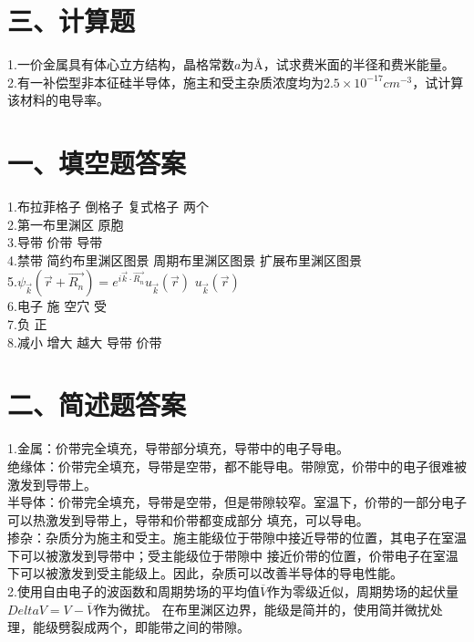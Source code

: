 \documentclass[UTF8]{ctexart}
\begin{document}
\section*{三、计算题}
1.一价金属具有体心立方结构，晶格常数$a$为\AA，试求费米面的半径和费米能量。\\
2.有一补偿型非本征硅半导体，施主和受主杂质浓度均为$2.5\times10^{-17}cm^{-3}$，试计算该材料的电导率。\\

\newpage
\section*{一、填空题答案}
1.布拉菲格子\makebox[2em]{}
倒格子\makebox[2em]{}
复式格子\makebox[2em]{}
两个\\
2.第一布里渊区\makebox[2em]{}
原胞\\
3.导带\makebox[2em]{}
价带\makebox[2em]{}
导带\\
4.禁带\makebox[2em]{}
简约布里渊区图景\makebox[2em]{}
周期布里渊区图景\makebox[2em]{}
扩展布里渊区图景\\
5.$\psi_{\vec{k}}(\vec{r}+\vec{R_n})=e^{i\vec{k}\cdot\vec{R_n}}u_{\vec{k}}(\vec{r})$\makebox[2em]{}
$u_{\vec{k}}(\vec{r})$\\
6.电子\makebox[2em]{}
施\makebox[2em]{}
空穴\makebox[2em]{}
受\\
7.负\makebox[2em]{}
正\\
8.减小\makebox[2em]{}
增大\makebox[2em]{}
越大\makebox[2em]{}
导带\makebox[2em]{}
价带\\
\section*{二、简述题答案}
1.金属：价带完全填充，导带部分填充，导带中的电子导电。\\
绝缘体：价带完全填充，导带是空带，都不能导电。带隙宽，价带中的电子很难被激发到导带上。\\
半导体：价带完全填充，导带是空带，但是带隙较窄。室温下，价带的一部分电子可以热激发到导带上，导带和价带都变成部分
填充，可以导电。\\
掺杂：杂质分为施主和受主。施主能级位于带隙中接近导带的位置，其电子在室温下可以被激发到导带中；受主能级位于带隙中
接近价带的位置，价带电子在室温下可以被激发到受主能级上。因此，杂质可以改善半导体的导电性能。\\
2.使用自由电子的波函数和周期势场的平均值$\overline{V}$作为零级近似，周期势场的起伏量$Delta V=V-\overline{V}$作为微扰。
在布里渊区边界，能级是简并的，使用简并微扰处理，能级劈裂成两个，即能带之间的带隙。\\
\end{document}
